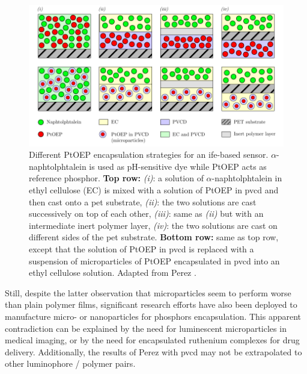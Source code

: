 \begin{figure}
	\centering
	\includegraphics{1_main_matter/thin_film_figures/encasp_pbl/encaps.pdf}
	\caption[Different PtOEP encapsulation strategies.]{Different PtOEP encapsulation strategies for an \gls{ife}-based sensor. $\alpha$-naphtolphtalein is used as pH-sensitive dye while PtOEP acts as reference phosphor. \textbf{Top row:} \textit{(i)}: a solution of $\alpha$-naphtolphtalein in ethyl cellulose (EC) is mixed with a solution of PtOEP in \gls{pvcd} and then cast onto a \gls{pet} substrate, \textit{(ii)}: the two solutions are cast successively on top of each other, \textit{(iii)}: same as \textit{(ii)} but with an intermediate inert polymer layer, \textit{(iv)}: the two solutions are cast on different sides of the \gls{pet} substrate. \textbf{Bottom row:} same as top row, except that the solution of PtOEP in \gls{pvcd} is replaced with a suspension of microparticles of PtOEP encapsulated in \gls{pvcd} into an ethyl cellulose solution. Adapted from Perez \etal{}\cite{perez2009}.}
	\label{fig:thin_film:pbl:encaps}
\end{figure}

Still, despite the latter observation that microparticles seem to perform worse than plain polymer films, significant research efforts have also been deployed to manufacture micro- or nanoparticles for phosphors encapsulation\cite{neurauter2000_phd, kurner2001, bueltzingsloewen2004_phd, edwards2011_phd, ye2012}. This apparent contradiction can be explained by the need for luminescent microparticles in medical imaging\cite{khan2015, feng2023}, or by the need for encapsulated ruthenium complexes for drug delivery\cite{villemin2019}. Additionally, the results of Perez with \gls{pvcd}\cite{perez2009} may not be extrapolated to other luminophore / polymer pairs\cite[Chap.~5]{bueltzingsloewen2004_phd}.

